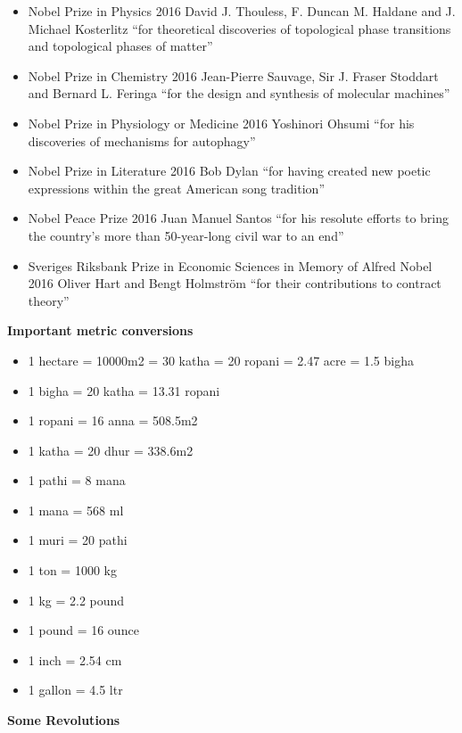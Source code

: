 \documentclass[
  openany]{book}
\providecommand{\tightlist}{%
  \setlength{\itemsep}{0pt}\setlength{\parskip}{0pt}}
\begin{document}
\begin{itemize}
\tightlist
\item
  Nobel Prize in Physics 2016 David J. Thouless, F. Duncan M. Haldane and J. Michael Kosterlitz ``for theoretical discoveries of topological phase transitions and topological phases of matter''
\item
  Nobel Prize in Chemistry 2016 Jean-Pierre Sauvage, Sir J. Fraser Stoddart and Bernard L. Feringa ``for the design and synthesis of molecular machines''
\item
  Nobel Prize in Physiology or Medicine 2016 Yoshinori Ohsumi ``for his discoveries of mechanisms for autophagy''
\item
  Nobel Prize in Literature 2016 Bob Dylan ``for having created new poetic expressions within the great American song tradition''
\item
  Nobel Peace Prize 2016 Juan Manuel Santos ``for his resolute efforts to bring the country's more than 50-year-long civil war to an end''
\item
  Sveriges Riksbank Prize in Economic Sciences in Memory of Alfred Nobel 2016 Oliver Hart and Bengt Holmström ``for their contributions to contract theory''
\end{itemize}

\textbf{Important metric conversions}

\begin{itemize}
\tightlist
\item
  1 hectare = 10000m2 = 30 katha = 20 ropani = 2.47 acre = 1.5 bigha
\item
  1 bigha = 20 katha = 13.31 ropani
\item
  1 ropani = 16 anna = 508.5m2
\item
  1 katha = 20 dhur = 338.6m2
\item
  1 pathi = 8 mana
\item
  1 mana = 568 ml
\item
  1 muri = 20 pathi
\item
  1 ton = 1000 kg
\item
  1 kg = 2.2 pound
\item
  1 pound = 16 ounce
\item
  1 inch = 2.54 cm
\item
  1 gallon = 4.5 ltr
\end{itemize}

\textbf{Some Revolutions}
\end{document}
